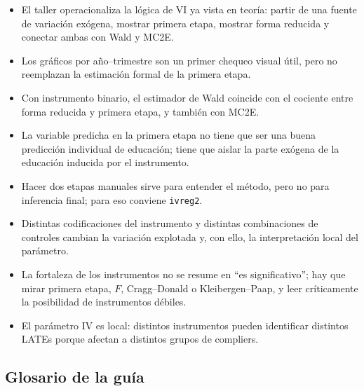\documentclass[11pt]{article}
\newcommand{\q}[1]{``#1''}
\begin{document}
\begin{itemize}[leftmargin=1.5em]
    \item El taller operacionaliza la lógica de VI ya vista en teoría: partir de una fuente de variación exógena, mostrar primera etapa, mostrar forma reducida y conectar ambas con Wald y MC2E.
    \item Los gráficos por año--trimestre son un primer chequeo visual útil, pero no reemplazan la estimación formal de la primera etapa.
    \item Con instrumento binario, el estimador de Wald coincide con el cociente entre forma reducida y primera etapa, y también con MC2E.
    \item La variable predicha en la primera etapa no tiene que ser una buena predicción individual de educación; tiene que aislar la parte exógena de la educación inducida por el instrumento.
    \item Hacer dos etapas manuales sirve para entender el método, pero no para inferencia final; para eso conviene \texttt{ivreg2}.
    \item Distintas codificaciones del instrumento y distintas combinaciones de controles cambian la variación explotada y, con ello, la interpretación local del parámetro.
    \item La fortaleza de los instrumentos no se resume en \q{es significativo}; hay que mirar primera etapa, \(F\), Cragg--Donald o Kleibergen--Paap, y leer críticamente la posibilidad de instrumentos débiles.
    \item El parámetro IV es local: distintos instrumentos pueden identificar distintos LATEs porque afectan a distintos grupos de compliers.
\end{itemize}

\subsection{Glosario de la guía}
\end{document}
